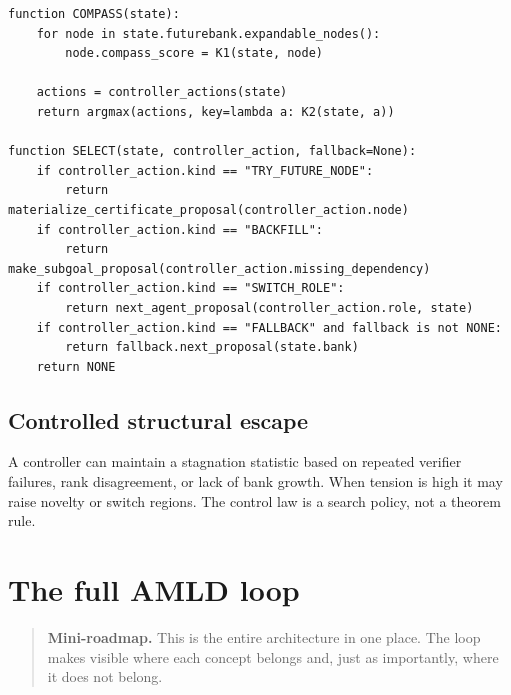 \documentclass[11pt,openany]{book}
\theoremstyle{definition}
\theoremstyle{remark}
\newenvironment{miniroadmap}{\begin{quote}\small\color{deepblue}\textbf{Mini-roadmap.} }{\end{quote}}
\begin{document}
\begin{lstlisting}[style=pseudo,caption={Compass and controller}]
function COMPASS(state):
    for node in state.futurebank.expandable_nodes():
        node.compass_score = K1(state, node)

    actions = controller_actions(state)
    return argmax(actions, key=lambda a: K2(state, a))

function SELECT(state, controller_action, fallback=None):
    if controller_action.kind == "TRY_FUTURE_NODE":
        return materialize_certificate_proposal(controller_action.node)
    if controller_action.kind == "BACKFILL":
        return make_subgoal_proposal(controller_action.missing_dependency)
    if controller_action.kind == "SWITCH_ROLE":
        return next_agent_proposal(controller_action.role, state)
    if controller_action.kind == "FALLBACK" and fallback is not NONE:
        return fallback.next_proposal(state.bank)
    return NONE
\end{lstlisting}

\section{Controlled structural escape}
A controller can maintain a stagnation statistic based on repeated verifier failures, rank disagreement, or lack of bank growth. When tension is high it may raise novelty or switch regions. The control law is a search policy, not a theorem rule.

\chapter{The full AMLD loop}
\begin{miniroadmap}
This is the entire architecture in one place. The loop makes visible where each concept belongs and, just as importantly, where it does not belong.
\end{miniroadmap}
\end{document}
